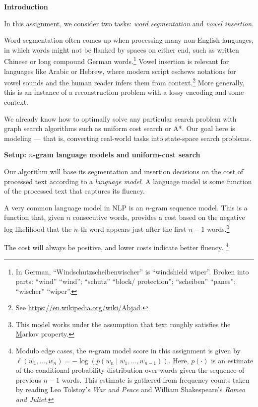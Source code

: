 {\bf Introduction}

In this assignment, we consider two tasks: {\em word segmentation} and {\em vowel
insertion}.

Word segmentation often comes up when processing many non-English languages, in
which words might not be flanked by spaces on either end, such as written
Chinese or long compound German words.\footnote{In German,
``Windschutzscheibenwischer'' is ``windshield wiper''. Broken into parts:
``wind'' \textrightarrow ``wind''; ``schutz'' \textrightarrow ``block/
protection''; ``scheiben'' \textrightarrow ``panes''; ``wischer''
\textrightarrow ``wiper''.} Vowel insertion is relevant for languages like
Arabic or Hebrew, where modern script eschews notations for vowel sounds and the
human reader infers them from context.\footnote{See
\url{https://en.wikipedia.org/wiki/Abjad}.} More generally, this is an instance
of a reconstruction problem with a lossy encoding and some context.

We already know how to optimally solve any particular search problem with graph
search algorithms such as uniform cost search or A*.  Our goal here is modeling
--- that is, converting real-world tasks into state-space search problems.

{\bf Setup: $n$-gram language models and uniform-cost search}

Our algorithm will base its segmentation and insertion decisions on the cost of
processed text according to a {\em language model}. A language model is some
function of the processed text that captures its fluency.

A very common language model in NLP is an $n$-gram sequence model. This is a
function that, given $n$ consecutive words, provides a cost based on the
negative log likelihood that the $n$-th word appears just after the first $n-1$
words.\footnote{This model works under the assumption that text roughly
satisfies the \href{https://en.wikipedia.org/wiki/Markov_property} Markov
 property.}

The cost will always be positive, and lower costs indicate better fluency.
\footnote{Modulo edge cases, the $n$-gram model score in this assignment is
given by $\ell(w_1, \ldots, w_n) = -\log(p(w_n \mid w_1, \ldots, w_{n-1}))$.
Here, $p(\cdot)$ is an estimate of the conditional probability distribution over
words given the sequence of previous $n-1$ words.  This estimate is gathered
from frequency counts taken by reading Leo Tolstoy's {\em War and Peace} and
William Shakespeare's {\em Romeo and Juliet}.}

